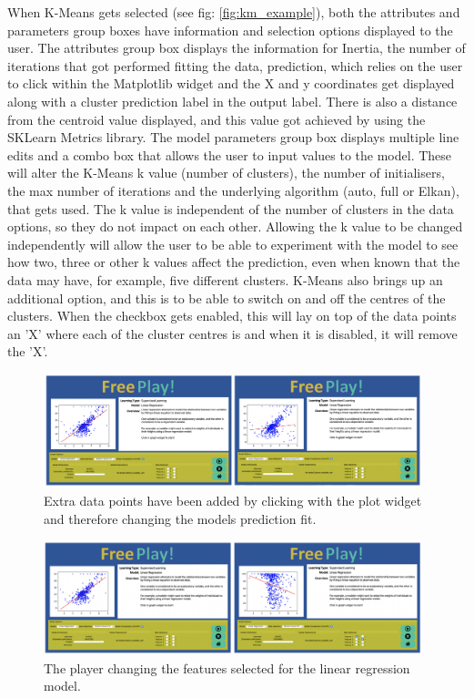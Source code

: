 		When K-Means gets selected (see fig: \ref{fig:km_example}), both the attributes and parameters group boxes have information and selection options displayed to the user. The attributes group box displays the information for Inertia, the number of iterations that got performed fitting the data, prediction, which relies on the user to click within the Matplotlib widget and the X and y coordinates get displayed along with a cluster prediction label in the output label. There is also a distance from the centroid value displayed, and this value got achieved by using the SKLearn Metrics library. The model parameters group box displays multiple line edits and a combo box that allows the user to input values to the model. These will alter the K-Means k value (number of clusters), the number of initialisers, the max number of iterations and the underlying algorithm (auto, full or Elkan), that gets used.  The k value is independent of the number of clusters in the data options, so they do not impact on each other. Allowing the k value to be changed independently will allow the user to be able to experiment with the model to see how two, three or other k values affect the prediction, even when known that the data may have, for example, five different clusters. K-Means also brings up an additional option, and this is to be able to switch on and off the centres of the clusters. When the checkbox gets enabled, this will lay on top of the data points an 'X' where each of the cluster centres is and when it is disabled, it will remove the 'X'.
		
		
		\begin{figure}[t]
			\begin{center}
				\includegraphics[width=11cm]{graphics/manipulating_lr_data.png}
				\caption{Extra data points have been added by clicking with the plot widget and therefore changing the models prediction fit.}
				\label{fig:manipulating_lr_data}
			\end{center}
		\end{figure}
	
		\begin{figure}[b]
			\begin{center}
				\includegraphics[width=11cm]{graphics/lr_changing_xy.png}
				\caption{The player changing the features selected for the linear regression model.}
				\label{fig:lr_changing_xy}
			\end{center}
		\end{figure}

